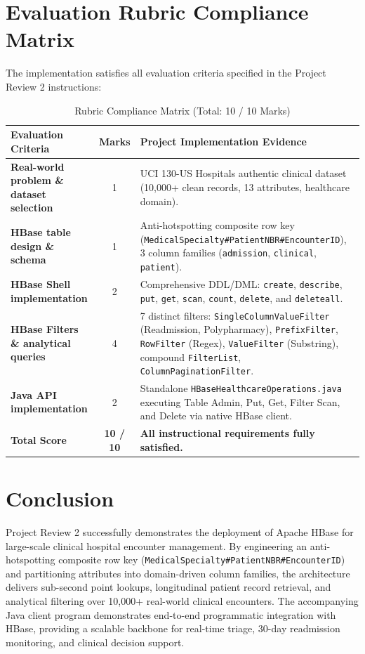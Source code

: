 \documentclass[12pt, a4paper]{article}
\begin{document}
\section{Evaluation Rubric Compliance Matrix}
The implementation satisfies all evaluation criteria specified in the Project Review 2 instructions:
\begin{table}[H]
\centering
\caption{Rubric Compliance Matrix (Total: 10 / 10 Marks)}
\begin{tabular}{p{5.5cm}cp{8cm}}
\toprule
\textbf{Evaluation Criteria} & \textbf{Marks} & \textbf{Project Implementation Evidence} \\
\midrule
\textbf{Real-world problem \& dataset selection} & 1 & UCI 130-US Hospitals authentic clinical dataset (10,000+ clean records, 13 attributes, healthcare domain). \\
\textbf{HBase table design \& schema} & 1 & Anti-hotspotting composite row key (\texttt{MedicalSpecialty\#PatientNBR\#EncounterID}), 3 column families (\texttt{admission}, \texttt{clinical}, \texttt{patient}). \\
\textbf{HBase Shell implementation} & 2 & Comprehensive DDL/DML: \texttt{create}, \texttt{describe}, \texttt{put}, \texttt{get}, \texttt{scan}, \texttt{count}, \texttt{delete}, and \texttt{deleteall}. \\
\textbf{HBase Filters \& analytical queries} & 4 & 7 distinct filters: \texttt{SingleColumnValueFilter} (Readmission, Polypharmacy), \texttt{PrefixFilter}, \texttt{RowFilter} (Regex), \texttt{ValueFilter} (Substring), compound \texttt{FilterList}, \texttt{ColumnPaginationFilter}. \\
\textbf{Java API implementation} & 2 & Standalone \texttt{HBaseHealthcareOperations.java} executing Table Admin, Put, Get, Filter Scan, and Delete via native HBase client. \\
\midrule
\textbf{Total Score} & \textbf{10 / 10} & \textbf{All instructional requirements fully satisfied.} \\
\bottomrule
\end{tabular}
\end{table}

\section{Conclusion}
Project Review 2 successfully demonstrates the deployment of Apache HBase for large-scale clinical hospital encounter management. By engineering an anti-hotspotting composite row key (\texttt{MedicalSpecialty\#PatientNBR\#EncounterID}) and partitioning attributes into domain-driven column families, the architecture delivers sub-second point lookups, longitudinal patient record retrieval, and analytical filtering over 10,000+ real-world clinical encounters. The accompanying Java client program demonstrates end-to-end programmatic integration with HBase, providing a scalable backbone for real-time triage, 30-day readmission monitoring, and clinical decision support.
\end{document}

